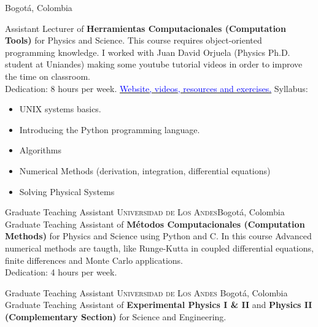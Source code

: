 \documentclass[12pt,letterpaper,sans]{moderncv}
\begin{document}
        {Bogot\'a, Colombia}{}
        {Assistant Lecturer of \textbf{Herramientas Computacionales (Computation Tools)} for 
          Physics and  Science. This course requires object-oriented programming knowledge.
          I worked with Juan David Orjuela (Physics Ph.D. student at Uniandes) making some youtube tutorial
          videos in order to improve the time on classroom.
          \\Dedication: 8 hours per week.
          \newline
          \href{https://github.com/ComputoCienciasUniandes/HerramientasComputacionales/tree/master/Lectures/98.Python}
               {\textcolor{blue}{Website, videos, resources and exercises.}}
               \newline{}
               Syllabus:
               \begin{itemize}
               \item UNIX systems basics.
               \item Introducing the Python programming language.
               \item Algorithms
               \item Numerical Methods (derivation, integration, differential equations)
               \item Solving Physical Systems
        \end{itemize}}

        {Graduate Teaching Assistant}
        {\textsc{Universidad de Los Andes}}{Bogot\'a, Colombia}{}
        {Graduate Teaching Assistant of \textbf{M\'etodos Computacionales (Computation Methods)} 
          for Physics and Science using Python and C. In this course Advanced numerical methods 
          are taugth, like Runge-Kutta in coupled differential equations, finite differences and
          Monte Carlo applications.\\
          Dedication: 4 hours per week.}
        

        {Graduate Teaching Assistant}
        {\textsc{Universidad de Los Andes}}
        {Bogot\'a, Colombia}{}
        {Graduate Teaching Assistant of \textbf{Experimental Physics I \& II} and 
          \textbf{Physics II (Complementary Section)} for Science and Engineering.}

\end{document}
